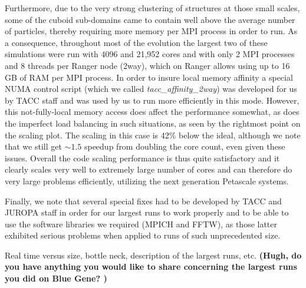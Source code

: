 Furthermore, due to the very strong clustering of structures at those small 
scales, some of the cuboid sub-domains came to contain well above the 
average number of particles, thereby requiring more memory per MPI process
in order to run. As a consequence, throughout most of the evolution the 
largest two of these simulations were run with 4096 and 21,952 cores and 
with only 2 MPI processes and 8 threads per Ranger node (2way), which on 
Ranger allows using up to 16 GB of RAM per MPI process. In order to insure 
local memory affinity a special NUMA control script (which we called {\it 
tacc\_affinity\_2way}) 
was developed for us by TACC staff and was used by us to run more efficiently 
in this mode. However, this not-fully-local memory access does affect the 
performance somewhat, as does the imperfect load balancing in such situations,
as seen by the rightmost point on the scaling plot. The scaling in this case
is 42\% below the ideal, although we note that we still get $\sim1.5$ speedup
from doubling the core count, even given these issues. Overall the
code scaling performance is thus quite satisfactory and it clearly 
scales very well to extremely large number of cores and can therefore 
do very large problems efficiently, utilizing the next generation 
Petascale systems. 

Finally, we note that several special fixes had to be developed by TACC 
and JUROPA staff in order for our largest runs to work properly and to be 
able to use the software libraries we required (MPICH and FFTW), as those 
latter exhibited serious problems when applied to runs of such 
unprecedented size. 

Real time versus size, bottle neck, description of the largest runs, etc.
{\bf (Hugh, do you have anything you would like to share 
concerning the largest runs you did on Blue Gene? )} 

